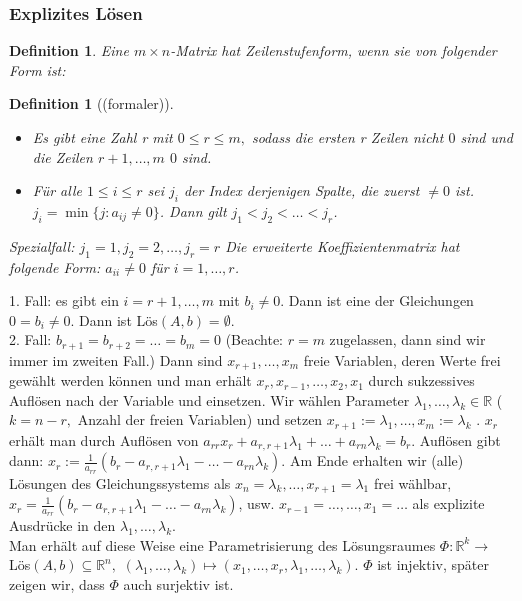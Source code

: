 \documentclass[12pt,a4paper]{article}
\theoremstyle{plain}
\newtheorem{Definition}[Theorem]{Definition}
\newcommand{\R}{\mathbb{R}}
\numberwithin{equation}{section}
\begin{document}
\subsubsection{Explizites Lösen}
\begin{Definition}
Eine $m\times n$-Matrix hat Zeilenstufenform, wenn sie von folgender Form ist: %
\end{Definition}
\begin{Definition}[(formaler)]
\begin{itemize}
\item Es gibt eine Zahl r mit $0\leq r\leq m,$ sodass die ersten r Zeilen nicht $0$ sind und die Zeilen $r+1,\ldots,m$ $0$ sind.
\item Für alle $1\leq i\leq r$ sei $j_i$ der Index derjenigen Spalte, die zuerst $\neq 0$ ist. $j_i=\min\{j:a_{ij}\neq 0\}$. Dann gilt $j_1<j_2<\ldots<j_r$.
\end{itemize}
Spezialfall: $j_1=1, j_2=2, \ldots, j_r=r$ %
Die erweiterte Koeffizientenmatrix hat folgende Form: %
$a_{ii}\neq 0$ für $i=1,\ldots,r$.
\end{Definition}
1. Fall: es gibt ein $i=r+1,\ldots,m$ mit $b_i\neq 0$. Dann ist eine der Gleichungen $0=b_i\neq 0$. Dann ist Lös$(A,b)=\emptyset$.\\
2. Fall: $b_{r+1}=b_{r+2}=\ldots=b_m=0$ (Beachte: $r=m$ zugelassen, dann sind wir immer im zweiten Fall.) Dann sind $x_{r+1},\ldots,x_m$ freie Variablen, deren Werte frei gewählt werden können und man erhält $x_r,x_{r-1},\ldots,x_2,x_1$ durch sukzessives Auflösen nach der Variable und einsetzen. Wir wählen Parameter $\lambda_1,\ldots,\lambda_k\in\R$ ($k=n-r,$ Anzahl der freien Variablen) und setzen $x_{r+1}:=\lambda_1,\ldots, x_m:=\lambda_k$ . $x_r$ erhält man durch Auflösen von $a_{rr}x_r+a_{r,r+1}\lambda_1+\ldots+a_{rn}\lambda_k=b_r$. Auflösen gibt dann: $x_r:=\frac{1}{a_{rr}}(b_r-a_{r,r+1}\lambda_1-\ldots-a_{rn}\lambda_k)$. Am Ende erhalten wir (alle) Lösungen des Gleichungssystems als $x_n=\lambda_k,\ldots,x_{r+1}=\lambda_1$ frei wählbar, $x_r=\frac{1}{a_{rr}}(b_r-a_{r,r+1}\lambda_1-\ldots-a_{rn}\lambda_k)$, usw. $x_{r-1}=\ldots,\ldots,x_1=\ldots$ als explizite Ausdrücke in den $\lambda_1, \ldots,\lambda_k$. \\
Man erhält auf diese Weise eine Parametrisierung des Lösungsraumes $\Phi:\R^k \rightarrow $ Lös$(A,b)\subseteq \R^n,$ $(\lambda_1,\ldots,\lambda_k)\mapsto (x_1,\ldots,x_r,\lambda_1,\ldots,\lambda_k)$. $\Phi$ ist injektiv, später zeigen wir, dass $\Phi$ auch surjektiv ist.
\end{document}
